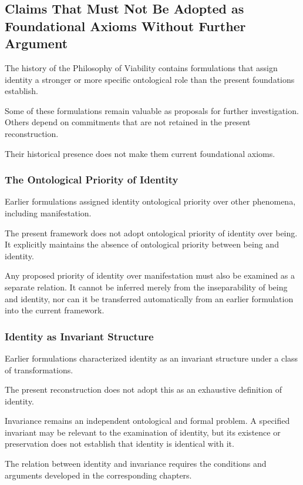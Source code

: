 \subsection{Claims That Must Not Be Adopted as Foundational Axioms Without Further Argument}

The history of the Philosophy of Viability
contains formulations that assign identity
a stronger or more specific ontological
role than the present foundations establish.

Some of these formulations remain valuable
as proposals for further investigation.
Others depend on commitments that are
not retained in the present reconstruction.

Their historical presence does not make
them current foundational axioms.

\subsubsection{The Ontological Priority of Identity}

Earlier formulations assigned identity
ontological priority over other phenomena,
including manifestation.

The present framework does not adopt
ontological priority of identity over
being. It explicitly maintains the
absence of ontological priority between
being and identity.

Any proposed priority of identity over
manifestation must also be examined
as a separate relation. It cannot be
inferred merely from the inseparability
of being and identity, nor can it be
transferred automatically from an
earlier formulation into the current
framework.

\subsubsection{Identity as Invariant Structure}

Earlier formulations characterized identity
as an invariant structure under a class
of transformations.

The present reconstruction does not
adopt this as an exhaustive definition
of identity.

Invariance remains an independent
ontological and formal problem. A
specified invariant may be relevant
to the examination of identity, but
its existence or preservation does
not establish that identity is identical
with it.

The relation between identity and
invariance requires the conditions
and arguments developed in the
corresponding chapters.

